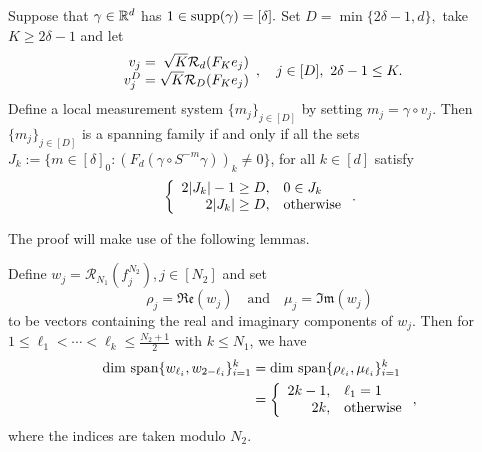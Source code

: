
\begin{proposition}
  Suppose that $\gamma \in \mathbb{R}^d$ has $1 \in \operatorname{supp}(\gamma) = [\delta].$  Set $D = \min\{2 \delta - 1, d\},$ take $K \ge 2 \delta - 1$ and let \[\begin{array}{r@{\;=\;}r}v_j & \sqrt{K} \mathcal{R}_d(F_K e_j) \\ v_j^D & \sqrt{K} \mathcal{R}_D(F_K e_j) \end{array},\quad j \in [D],\  2 \delta - 1 \le K.\]  Define a local measurement system  $\{m_j\}_{j \in [D]}$ by setting $m_j = \gamma \circ v_j$.  Then $\{m_j\}_{j \in [D]}$ is a spanning family if and only if all the sets $J_k := \{m \in [\delta]_0 : (F_d (\gamma \circ S^{-m} \gamma))_k \neq 0\}$, for all $k \in [d]$ satisfy \[\left\{\begin{array}{r@{,\quad}l} 2 |J_k| - 1 \ge D & 0 \in J_k \\ 2 |J_k| \ge D & \text{otherwise}\end{array}\right..\] \label{prop:spanning_family}
\end{proposition}


The proof will make use of the following lemmas.

\begin{lemma}
  Define $w_j = \mathcal{R}_{N_1}(f_j^{N_2}), j \in [N_2]$ and set \[\rho_j = \mathfrak{Re}(w_j) \quad\text{and}\quad \mu_j = \mathfrak{Im}(w_j)\] to be vectors containing the real and imaginary components of $w_j$.  Then for $1 \le \ell_1 < \cdots < \ell_k \le \frac{N_2 + 1}{2}$ with $k \le N_1$, we have \begin{align*} \dim\,\Span\{w_{\ell_i}, w_{2 - \ell_i}\}_{i = 1}^k &= \dim\,\Span\{\rho_{\ell_i}, \mu_{\ell_i}\}_{i = 1}^k \\ &= \left\{\begin{array}{r@{,\quad}l} 2k - 1 & \ell_1 = 1 \\ 2k & \text{otherwise}\end{array}\right.,\end{align*} where the indices are taken modulo $N_2$. \label{lem:conjugate_span_dim}
\end{lemma}

